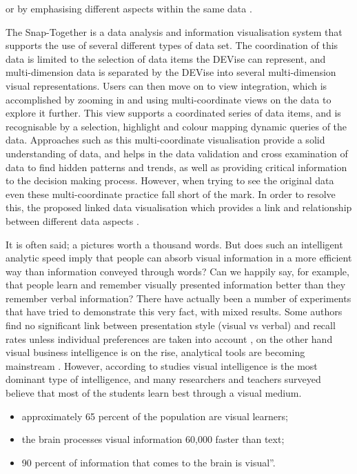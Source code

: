 or by emphasising different aspects within the same data  \cite{keim2002pixel}.

The Snap-Together \cite{north2000snap} is a data analysis and information visualisation system that supports the use of several different types of data set. The coordination of this data is limited to the selection of data items the DEVise can represent, and multi-dimension data is separated by the DEVise into several multi-dimension visual representations. Users can then move on to view integration, which is accomplished by zooming in and using multi-coordinate views on the data to explore it further.  This view supports a coordinated series of data items, and is recognisable by a selection, highlight and colour mapping dynamic queries of the data. Approaches such as this multi-coordinate visualisation provide a solid understanding of data, and helps in the data validation and cross examination of data to find hidden patterns and trends, as well as providing critical information to the decision making process. However, when trying to see the original data even these multi-coordinate practice fall short of the mark. In order to resolve this, the proposed linked data visualisation which provides a link and relationship between different data aspects \cite{abraham2014multi}.

It is often said; a pictures worth a thousand words. But does such an intelligent analytic speed imply that people can absorb visual information in a more efficient way than information conveyed through words? Can we happily say, for example, that people learn and remember visually presented information better than they remember verbal information? There have actually been a number of experiments that have tried to demonstrate this very fact, with mixed results. Some authors find no significant link between presentation style (visual vs verbal) and recall rates unless individual preferences are taken into account \cite{butler1996multimedia}, on the other hand visual business intelligence is on the rise, analytical tools are becoming mainstream \cite{basole2014visual}. However, according to studies visual intelligence is the most dominant type of intelligence, and many researchers and teachers surveyed \cite{survey1} believe that most of the students learn best through a visual medium.

\begin{itemize}
\item  approximately 65 percent of the population are visual learners; 
\item the brain processes visual information 60,000 faster than text; 
\item 90 percent of information that comes to the brain is visual”. 
\end{itemize}

